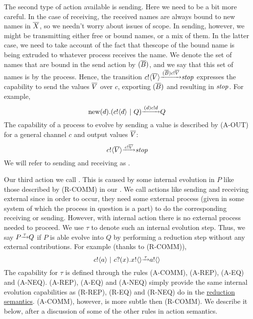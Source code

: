 The second type of action available is sending.  
Here we need to be a bit more careful.  
In the case of receiving, the received names are always bound to new names in $\overline{X}$, so we needn't worry about issues of scope.  
In sending, however, we might be transmitting either free or bound names, or a mix of them.  
In the latter case, we need to take account of the fact that thescope of the bound name is being extruded to whatever process receives the name.  
We denote the set of names that are bound in the send action by $({\overline{B}})$, and we say that this set of names is  by the process.  
Hence, the transition ${c}!\langle{ \ensuremath{\overline{V}} }\rangle \overset{\underrightarrow{\ { \ensuremath{({\overline{B}})}  \ensuremath{{c}!{\overline{V}}} }\ }}{} \mbox{\emph{stop}}$ expresses the capability to send the values $\overline{V}$ over $c$, exporting $({\overline{B}})$ and resulting in $\mbox{\emph{stop}}$.  
For example,
\[
	\text{new}({d}).({c}!\langle{d}\rangle \ |\  Q) \overset{\underrightarrow{\ { \ensuremath{({d})}  \ensuremath{{c}!{d}} }\ }}{} Q
\]
The capability of a process to evolve by sending a value is described by (A-OUT) for a general channel $c$ and output values $\overline{V}$:
\[
	{c}!\langle{ \ensuremath{\overline{V}} }\rangle \overset{\underrightarrow{\ { \ensuremath{{c}!{\overline{V}}} }\ }}{} \mbox{\emph{stop}} 
\]
We will refer to sending and receiving as .

Our third action we call . 
This is caused by some internal evolution in $P$ like those described by (R-COMM) in our .  
We call actions like sending and receiving external since in order to occur, they need some external process (given in some system of which the process in question is a part) to do the corresponding receiving or sending.  
However, with internal action there is no external process needed to proceed.  
We use $\tau$ to denote such an internal evolution step.  
Thus, we say $P \overset{\underrightarrow{\ {\tau}\ }}{} Q$ if $P$ is able evolve into $Q$ by performing a reduction step without any external contributions.  
For example (thanks to (R-COMM)),
\[
	{c}!\langle{a}\rangle \ |\  {c}?({x}).{x}!\langle{}\rangle \overset{\underrightarrow{\ {\tau}\ }}{} {a}!\langle{}\rangle 
\]
The capability for $\tau$ is defined through the rules (A-COMM), (A-REP), (A-EQ) and (A-NEQ).  (A-REP), (A-EQ) and (A-NEQ) simply provide the same internal evolution capabilities as (R-REP), (R-EQ) and (R-NEQ) do in the \hyperref[secreducationsemantics]{reduction semantics}. (A-COMM), however, is more subtle then (R-COMM).  We describe it below, after a discussion of some of the other rules in action semantics.

